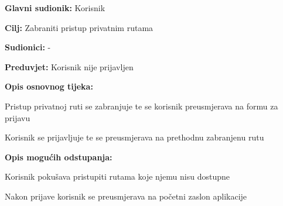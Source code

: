 \noindent {}
\begin{packed_item}
	
	\item \textbf{Glavni sudionik:} Korisnik
	\item \textbf{Cilj:} Zabraniti pristup privatnim rutama
	\item \textbf{Sudionici:} -
	\item \textbf{Preduvjet:} Korisnik nije prijavljen
	\item \textbf{Opis osnovnog tijeka:}
	
	\item[] \begin{packed_enum}
		
		\item Pristup privatnoj ruti se zabranjuje te se korisnik preusmjerava na formu za prijavu
		\item Korisnik se prijavljuje te se preusmjerava na prethodnu zabranjenu rutu

	\end{packed_enum}
	
	\item  \textbf{Opis mogućih odstupanja:}
	
	\item[] \begin{packed_item}
		
		\item[2.a] Korisnik pokušava pristupiti rutama koje njemu nisu dostupne
		\item[] \begin{packed_enum}
			
			\item Nakon prijave korisnik se preusmjerava na početni zaslon aplikacije
			
		\end{packed_enum}
		
	\end{packed_item}
\end{packed_item}

